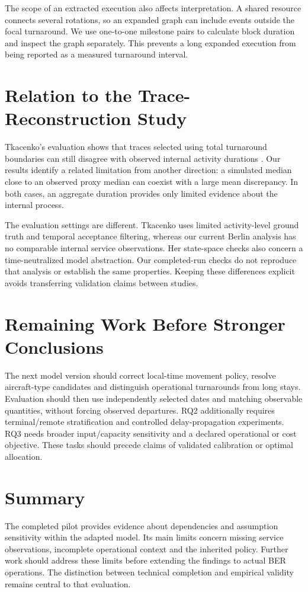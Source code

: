 The scope of an extracted execution also affects interpretation. A shared resource connects several rotations, so an expanded graph can include events outside the focal turnaround. We use one-to-one milestone pairs to calculate block duration and inspect the graph separately. This prevents a long expanded execution from being reported as a measured turnaround interval.

\section{Relation to the Trace-Reconstruction Study}
Tkacenko's evaluation shows that traces selected using total turnaround boundaries can still disagree with observed internal activity durations \cite[Section~6.2]{tkacenko2026}. Our results identify a related limitation from another direction: a simulated median close to an observed proxy median can coexist with a large mean discrepancy. In both cases, an aggregate duration provides only limited evidence about the internal process.

The evaluation settings are different. Tkacenko uses limited activity-level ground truth and temporal acceptance filtering, whereas our current Berlin analysis has no comparable internal service observations. Her state-space checks also concern a time-neutralized model abstraction. Our completed-run checks do not reproduce that analysis or establish the same properties. Keeping these differences explicit avoids transferring validation claims between studies.

\section{Remaining Work Before Stronger Conclusions}
The next model version should correct local-time movement policy, resolve aircraft-type candidates and distinguish operational turnarounds from long stays. Evaluation should then use independently selected dates and matching observable quantities, without forcing observed departures. RQ2 additionally requires terminal/remote stratification and controlled delay-propagation experiments. RQ3 needs broader input/capacity sensitivity and a declared operational or cost objective. These tasks should precede claims of validated calibration or optimal allocation.


\section{Summary}
The completed pilot provides evidence about dependencies and assumption sensitivity within the adapted model. Its main limits concern missing service observations, incomplete operational context and the inherited policy. Further work should address these limits before extending the findings to actual BER operations. The distinction between technical completion and empirical validity remains central to that evaluation.
